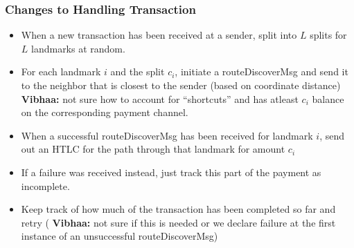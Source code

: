 \documentclass[a4paper]{article}
\newcommand{\vls}[1]{{\color{blue} \textbf{Vibhaa:} {#1}}}
\begin{document}
\subsubsection{Changes to Handling Transaction}
\begin{itemize}
    \item When a new transaction has been received at a sender, split into $L$ splits for $L$ landmarks at 
        random.
    \item For each landmark $i$ and the split $c_i$, initiate a routeDiscoverMsg and send it to the neighbor
        that is closest to the sender (based on coordinate distance) \vls{not sure how to account for 
        ``shortcuts''} and has atleast $c_i$ balance on the corresponding payment channel.
    \item When a successful routeDiscoverMsg has been received for landmark $i$, send out an HTLC for
        the path through that landmark for amount $c_i$
    \item If a failure was received instead, just track this part of the payment as incomplete. 
    \item Keep track of how much of the transaction has been completed so far and retry (\vls{not sure if 
        this is needed or we declare failure at the first instance of an unsuccessful routeDiscoverMsg})
\end{itemize}
\end{document}
